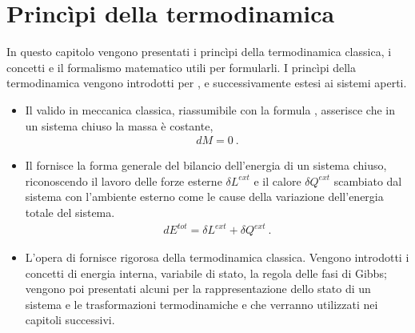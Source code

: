 \documentclass[letterpaper,10pt,italian]{jupyterBook}
\begin{document}
\sphinxstepscope


\chapter{Princìpi della termodinamica}
\label{\detokenize{ch/thermodynamics/principles:principi-della-termodinamica}}\label{\detokenize{ch/thermodynamics/principles:physics-hs-thermodynamics-principles}}\label{\detokenize{ch/thermodynamics/principles::doc}}
\sphinxAtStartPar
In questo capitolo vengono presentati i princìpi della termodinamica classica, i concetti e il formalismo matematico utili per formularli.
I princìpi della termodinamica vengono introdotti per , e successivamente estesi ai sistemi aperti.


\begin{itemize}
\item {} 
\sphinxAtStartPar
Il {\hyperref[\detokenize{ch/thermodynamics/principles-lavoisier:physics-hs-thermodynamics-foundation-principles-lavoisier}]{}} valido in meccanica classica, riassumibile con la formula , asserisce che in un sistema chiuso la massa è costante,
\begin{equation*}
\begin{split}d M = 0 \ .\end{split}
\end{equation*}
\item {} 
\sphinxAtStartPar
Il {\hyperref[\detokenize{ch/thermodynamics/principles-first:physics-hs-thermodynamics-foundation-principles-first}]{}} fornisce la forma generale del bilancio dell’energia  di un sistema chiuso, riconoscendo il lavoro delle forze esterne \(\delta L^{ext}\) e il calore \(\delta Q^{ext}\) scambiato dal sistema con l’ambiente esterno come le cause della variazione dell’energia totale del sistema.
\begin{equation*}
\begin{split}d E^{tot} = \delta L^{ext} + \delta Q^{ext} \ .\end{split}
\end{equation*}
\item {} 
\sphinxAtStartPar
L’opera di  fornisce {\hyperref[\detokenize{ch/thermodynamics/principles-gibbs-phase-rule:physics-hs-thermodynamics-foundation-principles-gibbs-phase-rule}]{}} rigorosa della termodinamica classica. Vengono introdotti i concetti di energia interna, variabile di stato, la regola delle fasi di Gibbs; vengono poi presentati alcuni {\hyperref[\detokenize{ch/thermodynamics/principles-phase-diagrams:physics-hs-thermodynamics-foundation-principles-phase-diagrams}]{}} per la rappresentazione dello stato di un sistema e le trasformazioni termodinamiche e che verranno utilizzati nei capitoli successivi.


\end{itemize}
\end{document}

